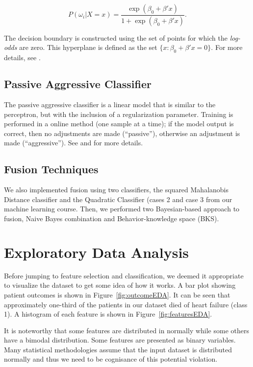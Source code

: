 \documentclass{article}
\begin{document}
\begin{equation}
    P(\omega_i|X = x) = \frac{\exp(\beta_0 + \beta'x)}{1+\exp(\beta_0+\beta'x)}.
\end{equation}

The decision boundary is constructed using the set of points for which the \textit{log-odds} are zero. This hyperplane is defined as the set $\{x: \beta_0 + \beta'x = 0\}$. For more details, see \citet{eslr}.

\subsection{Passive Aggressive Classifier}

The passive aggressive classifier is a linear model that is similar to the perceptron, but with the inclusion of a regularization parameter. Training is performed in a online method (one sample at a time); if the model output is correct, then no adjustments are made (``passive''), otherwise an adjustment is made (``aggressive''). See  \citet{crammer2006online} and \citet{sklearnlinear} for more details.

\subsection{Fusion Techniques}
We also implemented fusion using two classifiers, the squared Mahalanobis Distance classifier and the Quadratic Classifier (cases 2 and case 3 from our machine learning course. Then, we performed two Bayesian-based approach to fusion, Naive Bayes combination and Behavior-knowledge space (BKS).



\section{Exploratory Data Analysis}

Before jumping to feature selection and classification, we deemed it appropriate to visualize the dataset to get some idea of how it works. A bar plot showing patient outcomes is shown in Figure~\ref{fig:outcomeEDA}. It can be seen that approximately one-third of the patients in our dataset died of heart failure (class 1). A histogram of each feature is shown in Figure~\ref{fig:featuresEDA}.

It is noteworthy that some features are distributed in normally while some others have a bimodal distribution. Some features are presented as binary variables. Many statistical methodologies assume that the input dataset is distributed normally and thus we need to be cognisance of this potential violation. 
\end{document}
